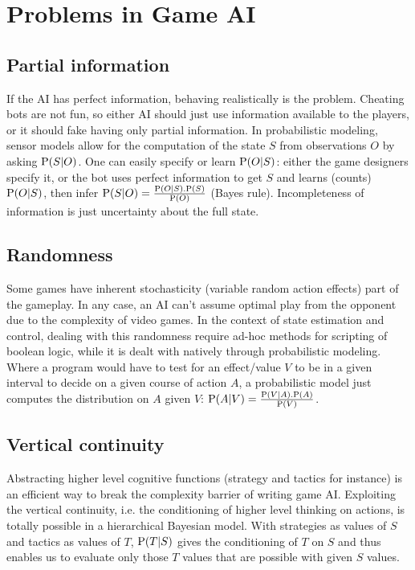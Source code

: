 \section{Problems in Game AI}

\subsection{Partial information}
If the AI has perfect information, behaving realistically is the problem. Cheating bots are not fun, so either AI should just use information available to the players, or it should fake having only partial information. In probabilistic modeling, sensor models allow for the computation of the state $S$ from observations $O$ by asking $\mathrm{P}(S|O)$. One can easily specify or learn $\mathrm{P}(O|S)$: either the game designers specify it, or the bot uses perfect information to get $S$ and learns (counts) $\mathrm{P}(O|S)$, then infer $\mathrm{P}(S|O) = \frac{\mathrm{P}(O|S).\mathrm{P}(S)}{\mathrm{P}(O)}$ (Bayes rule). Incompleteness of information is just uncertainty about the full state.

\subsection{Randomness}
Some games have inherent stochasticity (variable random action effects) part of the gameplay. In any case, an AI can't assume optimal play from the opponent due to the complexity of video games. In the context of state estimation and control, dealing with this randomness require ad-hoc methods for scripting of boolean logic, while it is dealt with natively through probabilistic modeling. Where a program would have to test for an effect/value $V$ to be in a given interval to decide on a given course of action $A$, a probabilistic model just computes the distribution on $A$ given $V$: $\mathrm{P}(A|V) = \frac{\mathrm{P}(V|A).\mathrm{P}(A)}{\mathrm{P}(V)}$.

\subsection{Vertical continuity}
Abstracting higher level cognitive functions (strategy and tactics for instance) is an efficient way to break the complexity barrier of writing game AI. Exploiting the vertical continuity, i.e. the conditioning of higher level thinking on actions, is totally possible in a hierarchical Bayesian model. With strategies as values of $S$ and tactics as values of $T$, $\mathrm{P}(T|S)$ gives the conditioning of $T$ on $S$ and thus enables us to evaluate only those $T$ values that are possible with given $S$ values.

